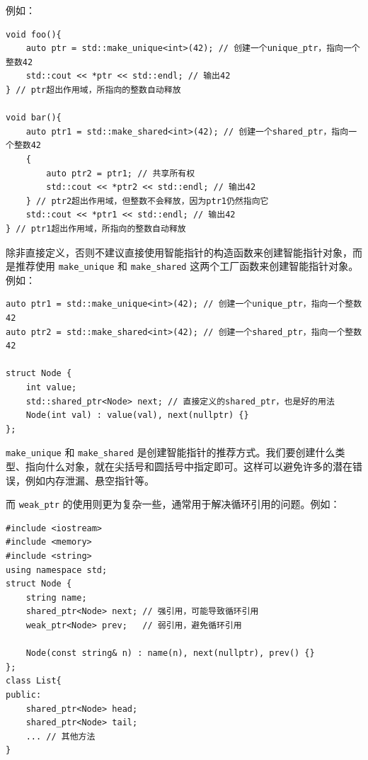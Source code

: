 例如：
\begin{verbatim}
void foo(){
    auto ptr = std::make_unique<int>(42); // 创建一个unique_ptr，指向一个整数42
    std::cout << *ptr << std::endl; // 输出42
} // ptr超出作用域，所指向的整数自动释放

void bar(){
    auto ptr1 = std::make_shared<int>(42); // 创建一个shared_ptr，指向一个整数42
    {
        auto ptr2 = ptr1; // 共享所有权
        std::cout << *ptr2 << std::endl; // 输出42
    } // ptr2超出作用域，但整数不会释放，因为ptr1仍然指向它
    std::cout << *ptr1 << std::endl; // 输出42
} // ptr1超出作用域，所指向的整数自动释放
\end{verbatim}
除非直接定义，否则不建议直接使用智能指针的构造函数来创建智能指针对象，而是推荐使用 \texttt{make\_unique} 和 \texttt{make\_shared} 这两个工厂函数来创建智能指针对象。例如：
\begin{verbatim}
auto ptr1 = std::make_unique<int>(42); // 创建一个unique_ptr，指向一个整数42
auto ptr2 = std::make_shared<int>(42); // 创建一个shared_ptr，指向一个整数42

struct Node {
    int value;
    std::shared_ptr<Node> next; // 直接定义的shared_ptr，也是好的用法
    Node(int val) : value(val), next(nullptr) {}
};
\end{verbatim}
\verb|make_unique| 和 \verb|make_shared| 是创建智能指针的推荐方式。我们要创建什么类型、指向什么对象，就在尖括号和圆括号中指定即可。这样可以避免许多的潜在错误，例如内存泄漏、悬空指针等。

而 \texttt{weak\_ptr} 的使用则更为复杂一些，通常用于解决循环引用的问题。例如：
\begin{verbatim}
#include <iostream>
#include <memory>
#include <string>
using namespace std;
struct Node {
    string name;
    shared_ptr<Node> next; // 强引用，可能导致循环引用
    weak_ptr<Node> prev;   // 弱引用，避免循环引用

    Node(const string& n) : name(n), next(nullptr), prev() {}
};
class List{
public:
    shared_ptr<Node> head;
    shared_ptr<Node> tail;
    ... // 其他方法
}
\end{verbatim}


